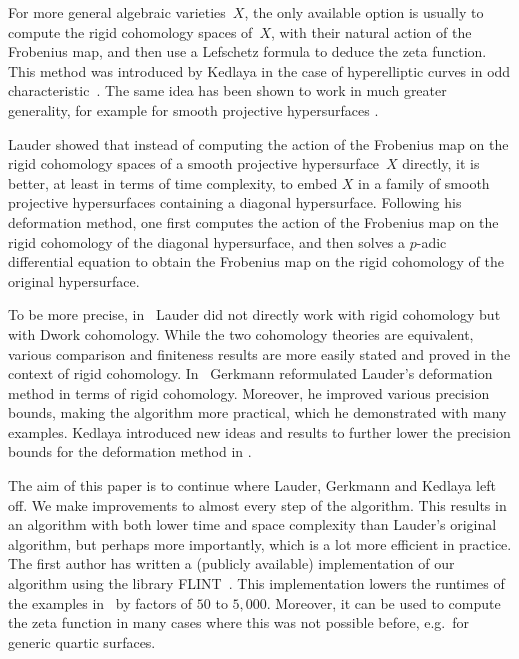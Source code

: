 \documentclass[a4paper,11pt]{article}
\numberwithin{equation}{section}
\theoremstyle{definition}
\begin{document}
For more general algebraic varieties~$X$, the only available option is 
usually to compute the rigid cohomology spaces of~$X$, with their natural 
action of the Frobenius map, and then use a Lefschetz formula to deduce the 
zeta function. This method was introduced by Kedlaya in the case of 
hyperelliptic curves in odd characteristic~\citep{Kedlaya2001}.  The same 
idea has been shown to work in much greater generality, for example for 
smooth projective hypersurfaces \citep{AbbottKedlayaRoe2006}. 

Lauder \citep{Lauder2004a,Lauder2004b} showed that instead of computing the 
action of the Frobenius map on the rigid cohomology spaces of a smooth 
projective hypersurface~$X$ directly, it is better, at least in terms of 
time complexity, to embed $X$ in a family of smooth projective hypersurfaces 
containing a diagonal hypersurface.  Following his deformation method, 
one first computes the action of the Frobenius map on the rigid cohomology 
of the diagonal hypersurface, and then solves a $p$-adic differential equation 
to obtain the Frobenius map on the rigid cohomology of the original 
hypersurface. 

To be more precise, in~\citep{Lauder2004a,Lauder2004b} Lauder did not directly 
work with rigid cohomology but with Dwork cohomology. While the two 
cohomology theories are equivalent, various comparison and finiteness results 
are more easily stated and proved in the context of rigid cohomology.  In~\citep{Gerkmann2007} 
Gerkmann reformulated Lauder's deformation method in terms of rigid 
cohomology.  Moreover, he improved various precision bounds, making 
the algorithm more practical, which he demonstrated with many examples. Kedlaya 
introduced new ideas and results to further lower the precision bounds for 
the deformation method in \citep{Kedlaya2012}.

The aim of this paper is to continue where Lauder, Gerkmann and Kedlaya left 
off. We make improvements to almost every step of the algorithm. This results 
in an algorithm with both lower time and space complexity than Lauder's 
original algorithm, but perhaps more importantly, which is a lot more efficient
in practice. The first author has written a (publicly available) 
implementation of our algorithm using the library FLINT~\citep{FLINT}. 
This implementation lowers the runtimes of the examples in~\citep{Gerkmann2007} 
by factors of $50$ to $5,000$. Moreover, it can be used to compute the zeta 
function in many cases where this was not possible before, e.g.\ for generic 
quartic surfaces.
\end{document}
